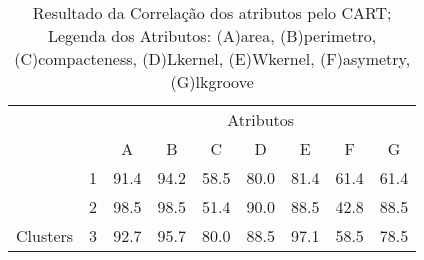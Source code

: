 \begin{table}[!h]
    
    \caption{Resultado da Correlação dos atributos pelo CART; Legenda dos Atributos: (A)area, (B)perimetro, (C)compacteness, (D)Lkernel, (E)Wkernel, (F)asymetry, (G)lkgroove}    
    \centering
   \small\addtolength{\tabcolsep}{1pt}
    \begin{tabular}{|cl|c|c|c|c|c|c|c|}
        \hline \hline
                                &   & \multicolumn{7}{c|}{Atributos}          \\ \cline{3-9} 
        \multicolumn{1}{|l}{}                            &   & A    & B & C & D & E & F & G \\ \hline
        \multicolumn{1}{|c|}{}                           & 1 & 91.4 & 94.2   & 58.5      & 80.0 & 81.4 & 61.4   & 61.4   \\ \cline{2-9} 
        \multicolumn{1}{|c|}{}                           & 2 & 98.5 & 98.5   & 51.4      & 90.0 & 88.5 & 42.8  & 88.5  \\ \cline{2-9} 
        \multicolumn{1}{|c|}{\multirow{-3}{*}{Clusters}} & 3 & 92.7 & 95.7   & 80.0      & 88.5 & 97.1 & 58.5  & 78.5  \\ \hline
    \end{tabular}
    \label{tab:matrelevancia:seeds:cart} 
\end{table}

